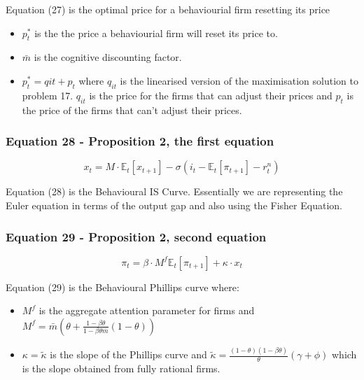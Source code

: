 \documentclass{article}
\begin{document}
Equation (27) is the optimal price for a behaviourial firm resetting its price
\begin{itemize}
    \item $p^{*}_{t}$ is the the price a behaviourial firm will reset its price to. 
    \item $\bar{m}$ is the cognitive discounting factor. 
    \item $p^{*}_{t}= q{it}+p_{t}$ where $q_{it}$ is the linearised version of the maximisation solution to problem 17. $q_{it}$ is the price for the firms that can adjust their prices and $p_{t}$ is the price of the firms that can't adjust their prices.
\end{itemize}

\subsubsection*{Equation 28 - Proposition 2, the first equation}
\begin{equation}\tag{28}
    x_{t}=M\cdot\mathbb{E}_{t}\left[x_{t+1}\right]-\sigma(i_{t}-\mathbb{E}_{t}\left[\pi_{t+1}\right]-r^{n}_{t})
\end{equation}

Equation (28) is the Behavioural IS Curve. Essentially we are representing the Euler equation in terms of the output gap and also using the Fisher Equation.

\subsubsection*{Equation 29 - Proposition 2, second equation}
\begin{equation}\tag{29}
    \pi_{t}=\beta\cdot M^{f} \mathbb{E}_{t}\left[\pi_{t+1}\right]+\kappa\cdot x_{t}
\end{equation}

Equation (29) is the Behavioural Phillips curve where: 
\begin{itemize}
    \item $M^{f}$ is the aggregate attention parameter for firms and $M^{f}=\bar{m}\left(\theta+\frac{1-\beta\theta}{1-\beta\theta\bar{m}}(1-\theta)\right)$
    \item $\kappa=\widetilde{\kappa}$  is the slope of the Phillips curve and $\widetilde{\kappa} =  \frac{(1-\theta)(1-\beta\theta)}{\theta}(\gamma+\phi)$ which is the slope obtained from fully rational firms. 

\end{itemize}
\end{document}
